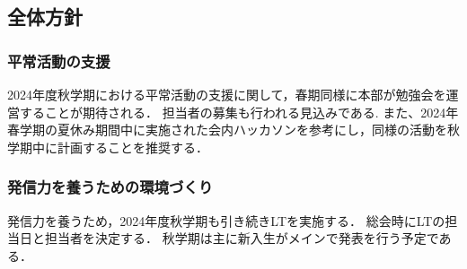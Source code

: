 \subsection*{全体方針}


\subsubsection*{平常活動の支援}
2024年度秋学期における平常活動の支援に関して，春期同様に本部が勉強会を運営することが期待される．
担当者の募集も行われる見込みである.
また、2024年春学期の夏休み期間中に実施された会内ハッカソンを参考にし，同様の活動を秋学期中に計画することを推奨する．

\subsubsection*{発信力を養うための環境づくり}
発信力を養うため，2024年度秋学期も引き続きLTを実施する．
総会時にLTの担当日と担当者を決定する．
秋学期は主に新入生がメインで発表を行う予定である．
